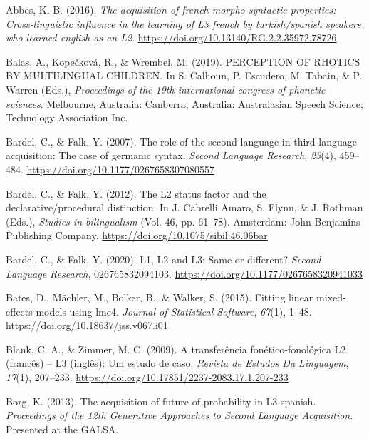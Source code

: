 \documentclass[
  man]{apa6}
\newlength{\cslhangindent}
\newlength{\cslentryspacingunit} %
\newenvironment{CSLReferences}[2] %
 {%
  \setlength{\parindent}{0pt}
  \ifodd #1
  \let\oldpar\par
  \def\par{\hangindent=\cslhangindent\oldpar}
  \fi
  \setlength{\parskip}{#2\cslentryspacingunit}
 }%
 {}
\begin{document}
\hypertarget{refs}{}
\begin{CSLReferences}{1}{0}
\leavevmode{}%
Abbes, K. B. (2016). \emph{The acquisition of french morpho-syntactic properties: Cross-linguistic influence in the learning of L3 french by turkish/spanish speakers who learned english as an L2}. \url{https://doi.org/10.13140/RG.2.2.35972.78726}

\leavevmode{}%
Balas, A., Kopečková, R., \& Wrembel, M. (2019). {PERCEPTION} {OF} {RHOTICS} {BY} {MULTILINGUAL} {CHILDREN}. In S. Calhoun, P. Escudero, M. Tabain, \& P. Warren (Eds.), \emph{Proceedings of the 19th international congress of phonetic sciences}. Melbourne, Australia: Canberra, Australia: Australasian Speech Science; Technology Association Inc.

\leavevmode{}%
Bardel, C., \& Falk, Y. (2007). The role of the second language in third language acquisition: The case of germanic syntax. \emph{Second Language Research}, \emph{23}(4), 459--484. \url{https://doi.org/10.1177/0267658307080557}

\leavevmode{}%
Bardel, C., \& Falk, Y. (2012). The L2 status factor and the declarative/procedural distinction. In J. Cabrelli Amaro, S. Flynn, \& J. Rothman (Eds.), \emph{Studies in bilingualism} (Vol. 46, pp. 61--78). Amsterdam: John Benjamins Publishing Company. \url{https://doi.org/10.1075/sibil.46.06bar}

\leavevmode{}%
Bardel, C., \& Falk, Y. (2020). L1, L2 and L3: Same or different? \emph{Second Language Research}, 026765832094103. \url{https://doi.org/10.1177/0267658320941033}

\leavevmode{}%
Bates, D., Mächler, M., Bolker, B., \& Walker, S. (2015). Fitting linear mixed-effects models using {lme4}. \emph{Journal of Statistical Software}, \emph{67}(1), 1--48. \url{https://doi.org/10.18637/jss.v067.i01}

\leavevmode{}%
Blank, C. A., \& Zimmer, M. C. (2009). A transferência fonético-fonológica L2 (francês) -- L3 (inglês): Um estudo de caso. \emph{Revista de Estudos Da Linguagem}, \emph{17}(1), 207--233. \url{https://doi.org/10.17851/2237-2083.17.1.207-233}

\leavevmode{}%
Borg, K. (2013). The acquisition of future of probability in L3 spanish. \emph{Proceedings of the 12th Generative Approaches to Second Language Acquisition}. Presented at the {GALSA}.


\end{CSLReferences}
\end{document}
